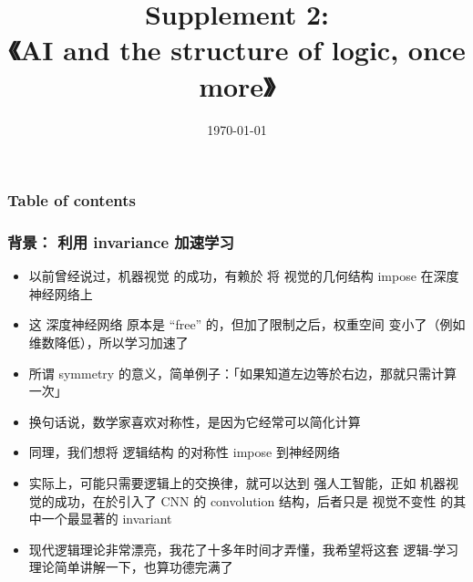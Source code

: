 \documentclass[16pt]{beamer}
\title[Structure of logic once more]{Supplement 2: \\ \vspace*{0.3cm} \cc{再谈一次 AI 的逻辑结构}
{\Huge《AI and the structure of logic, once more》}}
\author{\cc{YKY 甄景贤}{YKY}} %
\date{\today} %
\makeatletter
\newcommand{\emp}[1]{{\color{violet}#1}}
\newcommand{\smiley}{$\vcenter{\hbox{\texttt{[image: ../smiling-face.png]}}}$}
\newif\ifframeinlbf
\newcommand\listofframes{\@starttoc{lbf}}
\makeatother
\begin{document}
\frameinlbffalse
\addtocounter{page}{-1}
\begin{frame}
\titlepage
\end{frame}

\addtocounter{page}{-1}
\begin{frame}[noframenumbering]
\frametitle{Table of contents}
\listofframes
\end{frame}



\frameinlbftrue

%	

\begin{frame}
\frametitle{背景： 利用 invariance 加速学习}
\begin{itemize}
	\item 以前曾经说过，机器视觉 的成功，有赖於 将 视觉的几何结构 impose 在深度神经网络上
	\item 这 深度神经网络 原本是 ``free'' 的，但加了限制之后，权重空间 变小了（例如维数降低），所以学习加速了
	\item 所谓 symmetry 的意义，简单例子：「如果知道左边等於右边，那就只需计算一次」
	\item 换句话说，数学家喜欢对称性，是因为它经常可以简化计算
	\item 同理，我们想将 逻辑结构 的对称性 impose 到神经网络
	\item 实际上，可能只需要逻辑上的交换律，就可以达到 强人工智能，正如 机器视觉的成功，在於引入了 CNN 的 convolution 结构，后者只是 视觉不变性 的其中一个最显著的 invariant
	\item 现代逻辑理论非常漂亮，我花了十多年时间才弄懂，我希望将这套 逻辑-学习 理论简单讲解一下，也算功德完满了
\end{itemize}
\end{frame}
\end{document}
